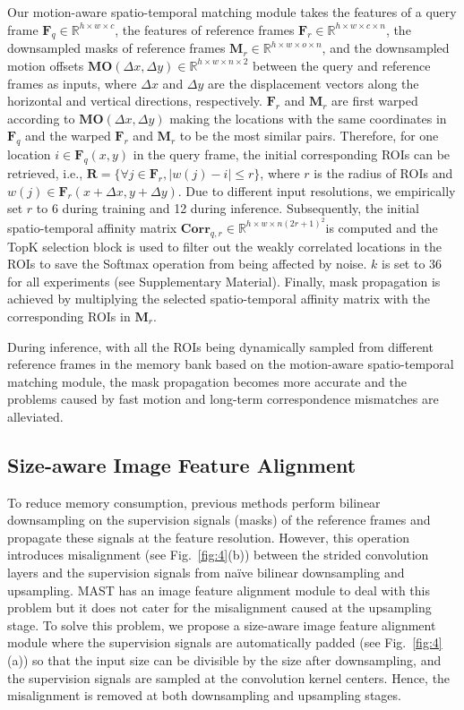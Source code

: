 \documentclass[letterpaper]{article} \usepackage{aaai22}  \usepackage{times}  \usepackage{helvet}  \usepackage{courier}  \usepackage[hyphens]{url}  \usepackage{graphicx} \urlstyle{rm} \def\UrlFont{\rm}  \usepackage{natbib}  \usepackage{caption} \DeclareCaptionStyle{ruled}{labelfont=normalfont,labelsep=colon,strut=off} \frenchspacing  \setlength{\pdfpagewidth}{8.5in}  \setlength{\pdfpageheight}{11in}  \usepackage{algorithm}
\begin{document}
Our motion-aware spatio-temporal matching module takes the features of a query frame $\bm{F}_{q} \in{\mathbb{R}^{h\times w\times c}}$, the features of reference frames $\bm{F}_{r} \in{\mathbb{R}^{h\times w\times c\times n}}$, the downsampled masks of reference frames $\bm{M}_{r} \in{\mathbb{R}^{h\times w\times o\times n}}$, and the downsampled motion offsets $\bm{MO}(\Delta x, \Delta y) \in \mathbb{R}^{h \times w \times n \times 2}$ between the query and reference frames as inputs, where $\Delta x$ and $\Delta y$ are the displacement vectors along the horizontal and vertical directions, respectively. $\bm{F}_{r}$ and $\bm{M}_{r}$ are first warped according to $\bm{MO}(\Delta x, \Delta y)$ making the locations with the same coordinates in $\bm{F}_{q}$ and the warped $\bm{F}_{r}$ and $\bm{M}_{r}$ to be the most similar pairs. Therefore, for one location $i \in \bm{F}_{q}(x,y)$ in the query frame, the initial corresponding ROIs can be retrieved, i.e., $\bm{R}=\{\forall j\in{\bm{F}_{r}}, \vert w(j)-i\vert \leq r\}$, where $r$ is the radius of ROIs and $w(j) \in \bm{F}_{r}(x+\Delta x,y+\Delta y)$. Due to different input resolutions, we empirically set $r$ to 6 during training and 12 during inference. Subsequently, the initial spatio-temporal affinity matrix $\bm{Corr}_{q,r} \in{\mathbb{R}^{h\times w\times n(2r+1)^{2}}}$is computed and the TopK selection block is used to filter out the weakly correlated locations in the ROIs to save the Softmax operation from being affected by noise. $k$ is set to 36 for all experiments (see Supplementary Material). Finally, mask propagation is achieved by multiplying the selected spatio-temporal affinity matrix with the corresponding ROIs in $\bm{M}_{r}$.

During inference, with all the ROIs being dynamically sampled from different reference frames in the memory bank based on the motion-aware spatio-temporal matching module, the mask propagation becomes more accurate and the problems caused by fast motion and long-term correspondence mismatches are alleviated.


\subsection{Size-aware Image Feature Alignment}
To reduce memory consumption, previous methods perform bilinear downsampling on the supervision signals (masks) of the reference frames and propagate these signals at the feature resolution. However, this operation introduces misalignment (see Fig.~\ref{fig:4}(b)) between the strided convolution layers and the supervision signals from na\"ive bilinear downsampling and upsampling. MAST \cite{MAST} has an image feature alignment module to deal with this problem but it does not cater for the misalignment caused at the upsampling stage. To solve this problem, we propose a size-aware image feature alignment module where the supervision signals are automatically padded (see Fig.~\ref{fig:4}(a)) so that the input size can be divisible by the size after downsampling, and the supervision signals are sampled at the convolution kernel centers. Hence, the misalignment is removed at both downsampling and upsampling stages.
\end{document}
